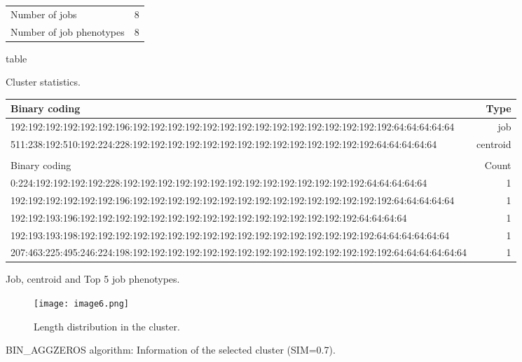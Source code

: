 \documentclass{jhps}
\begin{document}
\begin{cluster}
	\begin{subtable}{\textwidth}
		\centering
		\begin{tabular}{ll}
			Number of jobs & 8 \\
			Number of job phenotypes & 8 \\
		\end{tabular}
		\caption{table}{Cluster statistics.}
		\label{cluster:use_case:bin_aggzeros:stats}
	\end{subtable}
	\medskip
	\begin{subtable}{\textwidth}
		\centering
		\begin{tiny}
			\begin{tabular}{l|r}
				\rowcolor{tblhead}
				Binary coding                                                                                             &  Type     \\
				\hline
				192:192:192:192:192:192:196:192:192:192:192:192:192:192:192:192:192:192:192:192:192:192:64:64:64:64:64    &  job      \\
				511:238:192:510:192:224:228:192:192:192:192:192:192:192:192:192:192:192:192:192:192:64:64:64:64:64        &  centroid \\
				\multicolumn{2}{l}{}                                                                                      \\
				\rowcolor{tblhead}
				Binary coding                                                                                             &  Count    \\
				\hline
				0:224:192:192:192:192:228:192:192:192:192:192:192:192:192:192:192:192:192:192:192:64:64:64:64:64          &  1        \\
				192:192:192:192:192:192:196:192:192:192:192:192:192:192:192:192:192:192:192:192:192:192:64:64:64:64:64    &  1        \\
				192:192:193:196:192:192:192:192:192:192:192:192:192:192:192:192:192:192:192:192:64:64:64:64               &  1        \\
				192:193:193:198:192:192:192:192:192:192:192:192:192:192:192:192:192:192:192:192:192:64:64:64:64:64:64     &  1        \\
				207:463:225:495:246:224:198:192:192:192:192:192:192:192:192:192:192:192:192:192:192:192:64:64:64:64:64:64 &  1        \\
			\end{tabular}
		\end{tiny}
		\caption{Job, centroid and Top 5 job phenotypes.}
		\label{cluster:use_case:bin_aggzeros:top_jobs}
	\end{subtable}
	\medskip
	\begin{subfigure}{\textwidth}
		\centering
		\texttt{[image: image6.png]}
		\caption{Length distribution in the cluster.}
		\label{cluster:use_case:bin_aggzeros:length}
	\end{subfigure}
	\caption{BIN\_AGGZEROS algorithm: Information of the selected cluster (SIM=0.7).}
	\label{cluster:use_case:bin_aggzeros}
\end{cluster}
\end{document}
